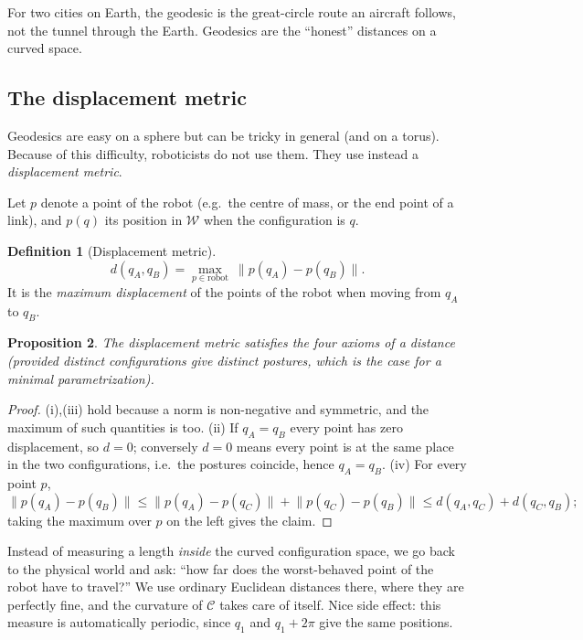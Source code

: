 \documentclass[11pt,a4paper]{article}
\newcommand{\W}{\mathcal{W}}
\newcommand{\C}{\mathcal{C}}
\newcommand{\norm}[1]{\lVert #1\rVert}
\theoremstyle{definition}
\newtheorem{definition}{Definition}[section]
\theoremstyle{plain}
\newtheorem{proposition}[definition]{Proposition}
\theoremstyle{remark}
\begin{document}
\begin{intuition}
For two cities on Earth, the geodesic is the great-circle route an aircraft follows, not the tunnel through the Earth. Geodesics are the ``honest'' distances on a curved space.
\end{intuition}

\subsection{The displacement metric}

Geodesics are easy on a sphere but can be tricky in general (and on a torus). Because of this difficulty, roboticists do not use them. They use instead a \emph{displacement metric}.

Let $p$ denote a point of the robot (e.g.\ the centre of mass, or the end point of a link), and $p(q)$ its position in $\W$ when the configuration is $q$.

\begin{definition}[Displacement metric]
\[
  d(q_A,q_B)=\max_{p\in\text{robot}}\ \norm{p(q_A)-p(q_B)} .
\]
It is the \emph{maximum displacement} of the points of the robot when moving from $q_A$ to $q_B$.
\end{definition}

\begin{proposition}
The displacement metric satisfies the four axioms of a distance (provided distinct configurations give distinct postures, which is the case for a minimal parametrization).
\end{proposition}

\begin{proof}
(i),(iii) hold because a norm is non-negative and symmetric, and the maximum of such quantities is too. (ii) If $q_A=q_B$ every point has zero displacement, so $d=0$; conversely $d=0$ means every point is at the same place in the two configurations, i.e.\ the postures coincide, hence $q_A=q_B$. (iv) For every point $p$,
\[
 \norm{p(q_A)-p(q_B)}\le\norm{p(q_A)-p(q_C)}+\norm{p(q_C)-p(q_B)}\le d(q_A,q_C)+d(q_C,q_B);
\]
taking the maximum over $p$ on the left gives the claim. \qedhere
\end{proof}

\begin{intuition}
Instead of measuring a length \emph{inside} the curved configuration space, we go back to the physical world and ask: ``how far does the worst-behaved point of the robot have to travel?'' We use ordinary Euclidean distances there, where they are perfectly fine, and the curvature of $\C$ takes care of itself. Nice side effect: this measure is automatically periodic, since $q_1$ and $q_1+2\pi$ give the same positions.
\end{intuition}
\end{document}
